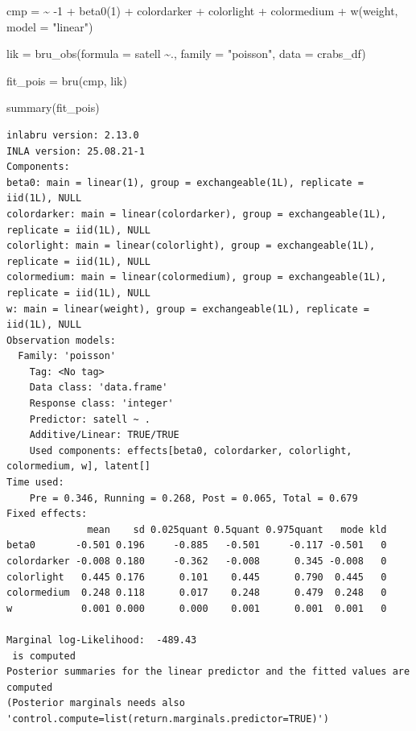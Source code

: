 \documentclass[
  letterpaper,
  DIV=11,
  numbers=noendperiod]{scrartcl}
\newenvironment{Shaded}{\begin{snugshade}}{\end{snugshade}}
\newcommand{\AttributeTok}[1]{\textcolor[rgb]{0.40,0.45,0.13}{#1}}
\newcommand{\DecValTok}[1]{\textcolor[rgb]{0.68,0.00,0.00}{#1}}
\newcommand{\ErrorTok}[1]{\textcolor[rgb]{0.68,0.00,0.00}{#1}}
\newcommand{\FunctionTok}[1]{\textcolor[rgb]{0.28,0.35,0.67}{#1}}
\newcommand{\NormalTok}[1]{\textcolor[rgb]{0.00,0.23,0.31}{#1}}
\newcommand{\OtherTok}[1]{\textcolor[rgb]{0.00,0.23,0.31}{#1}}
\newcommand{\SpecialCharTok}[1]{\textcolor[rgb]{0.37,0.37,0.37}{#1}}
\newcommand{\StringTok}[1]{\textcolor[rgb]{0.13,0.47,0.30}{#1}}
\begin{document}
\begin{Shaded}
\begin{Highlighting}[]
\NormalTok{cmp }\OtherTok{=}  \ErrorTok{\textasciitilde{}} \SpecialCharTok{{-}}\DecValTok{1} \SpecialCharTok{+} \FunctionTok{beta0}\NormalTok{(}\DecValTok{1}\NormalTok{) }\SpecialCharTok{+}\NormalTok{  colordarker }\SpecialCharTok{+}
\NormalTok{       colorlight }\SpecialCharTok{+}\NormalTok{ colormedium }\SpecialCharTok{+}
       \FunctionTok{w}\NormalTok{(weight, }\AttributeTok{model =} \StringTok{"linear"}\NormalTok{)}

\NormalTok{lik }\OtherTok{=}  \FunctionTok{bru\_obs}\NormalTok{(}\AttributeTok{formula =}\NormalTok{ satell }\SpecialCharTok{\textasciitilde{}}\NormalTok{.,}
            \AttributeTok{family =} \StringTok{"poisson"}\NormalTok{,}
            \AttributeTok{data =}\NormalTok{ crabs\_df)}

\NormalTok{fit\_pois }\OtherTok{=} \FunctionTok{bru}\NormalTok{(cmp, lik)}

\FunctionTok{summary}\NormalTok{(fit\_pois)}
\end{Highlighting}
\end{Shaded}

\begin{verbatim}
inlabru version: 2.13.0
INLA version: 25.08.21-1
Components:
beta0: main = linear(1), group = exchangeable(1L), replicate = iid(1L), NULL
colordarker: main = linear(colordarker), group = exchangeable(1L), replicate = iid(1L), NULL
colorlight: main = linear(colorlight), group = exchangeable(1L), replicate = iid(1L), NULL
colormedium: main = linear(colormedium), group = exchangeable(1L), replicate = iid(1L), NULL
w: main = linear(weight), group = exchangeable(1L), replicate = iid(1L), NULL
Observation models:
  Family: 'poisson'
    Tag: <No tag>
    Data class: 'data.frame'
    Response class: 'integer'
    Predictor: satell ~ .
    Additive/Linear: TRUE/TRUE
    Used components: effects[beta0, colordarker, colorlight, colormedium, w], latent[]
Time used:
    Pre = 0.346, Running = 0.268, Post = 0.065, Total = 0.679 
Fixed effects:
              mean    sd 0.025quant 0.5quant 0.975quant   mode kld
beta0       -0.501 0.196     -0.885   -0.501     -0.117 -0.501   0
colordarker -0.008 0.180     -0.362   -0.008      0.345 -0.008   0
colorlight   0.445 0.176      0.101    0.445      0.790  0.445   0
colormedium  0.248 0.118      0.017    0.248      0.479  0.248   0
w            0.001 0.000      0.000    0.001      0.001  0.001   0

Marginal log-Likelihood:  -489.43 
 is computed 
Posterior summaries for the linear predictor and the fitted values are computed
(Posterior marginals needs also 'control.compute=list(return.marginals.predictor=TRUE)')
\end{verbatim}
\end{document}

